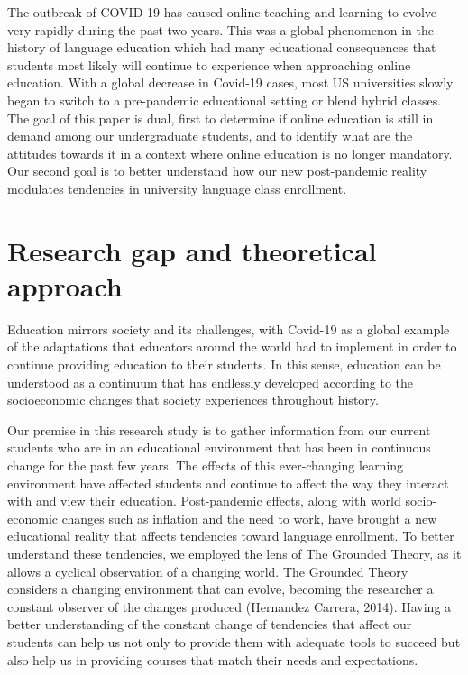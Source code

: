\documentclass[
  man]{apa6}
\begin{document}
The outbreak of COVID-19 has caused online teaching and learning to evolve very rapidly during the past two years. This was a global phenomenon in the history of language education which had many educational consequences that students most likely will continue to experience when approaching online education. With a global decrease in Covid-19 cases, most US universities slowly began to switch to a pre-pandemic educational setting or blend hybrid classes. The goal of this paper is dual, first to determine if online education is still in demand among our undergraduate students, and to identify what are the attitudes towards it in a context where online education is no longer mandatory. Our second goal is to better understand how our new post-pandemic reality modulates tendencies in university language class enrollment.

\hypertarget{research-gap-and-theoretical-approach}{%
\section{Research gap and theoretical approach}\label{research-gap-and-theoretical-approach}}

Education mirrors society and its challenges, with Covid-19 as a global example of the adaptations that educators around the world had to implement in order to continue providing education to their students. In this sense, education can be understood as a continuum that has endlessly developed according to the socioeconomic changes that society experiences throughout history.

Our premise in this research study is to gather information from our current students who are in an educational environment that has been in continuous change for the past few years. The effects of this ever-changing learning environment have affected students and continue to affect the way they interact with and view their education. Post-pandemic effects, along with world socio-economic changes such as inflation and the need to work, have brought a new educational reality that affects tendencies toward language enrollment. To better understand these tendencies, we employed the lens of The Grounded Theory, as it allows a cyclical observation of a changing world. The Grounded Theory considers a changing environment that can evolve, becoming the researcher a constant observer of the changes produced (Hernandez Carrera, 2014). Having a better understanding of the constant change of tendencies that affect our students can help us not only to provide them with adequate tools to succeed but also help us in providing courses that match their needs and expectations.
\end{document}
